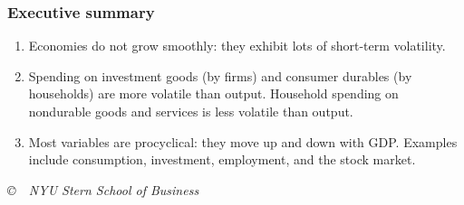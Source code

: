 \documentclass[letterpaper,12pt]{article}
\begin{document}
\subsubsection*{Executive summary}

\begin{enumerate}
\item Economies do not grow smoothly:  they exhibit lots of 
short-term volatility.  

\item Spending on investment goods (by firms) 
and consumer durables (by households) are more volatile
 than output.  
 Household spending on nondurable goods and services
 is less volatile than output.  

\item Most variables are procyclical: they move up and down with GDP.  
Examples include consumption, investment, employment, and the stock market.  

\end{enumerate}

\vfill \centerline{\it \copyright \ \number\year \ NYU Stern
School of Business}
\end{document}
